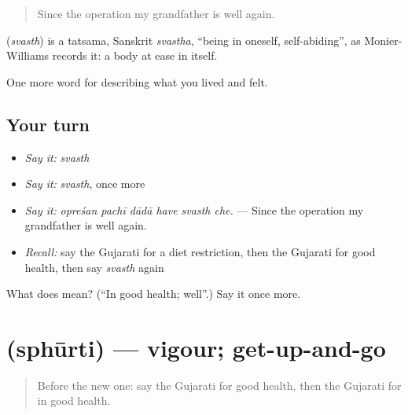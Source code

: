 \begin{quote}
Since the operation my grandfather is well again.
\end{quote}

\begin{cousinweb}
\textbf{} (\emph{svasth}) is a tatsama, Sanskrit \emph{svastha}, \textquotedblleft{}being in oneself, self-abiding\textquotedblright{}, as Monier-Williams records it: a body at ease in itself.
\end{cousinweb}

\begin{grammarlens}[title={What you've built}]
One more word for describing what you lived and felt.
\end{grammarlens}

\subsection*{Your turn}
\begin{itemize}
\raggedright
  \item \emph{Say it:} \emph{svasth}
  \item \emph{Say it:} \emph{svasth}, once more
  \item \emph{Say it:} \emph{opreśan pachī dādā have svasth che.} — Since the operation my grandfather is well again.
  \item \emph{Recall:} say the Gujarati for a diet restriction, then the Gujarati for good health, then say \emph{svasth} again
\end{itemize}

\begin{tcolorbox}[breakable,colback=teal!4,colframe=teal!35!black,title={Before you move on}]
What does  mean? (\textquotedblleft{}In good health; well\textquotedblright{}.) Say it once more.
\end{tcolorbox}
\section[\texorpdfstring{\gu{સ્ફૂર્તિ} (sphūrti)}{સ્ફૂર્તિ (sphūrti)}]{ (sphūrti) — vigour; get-up-and-go}

\label{lesson:GU-C486-sphurti}



\begin{quote}
Before the new one: say the Gujarati for good health, then the Gujarati for in good health.
\end{quote}

